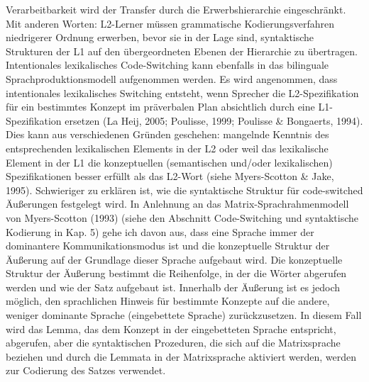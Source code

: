 \documentclass[
  letterpaper,
]{scrbook}
\begin{document}
Verarbeitbarkeit wird der Transfer durch die Erwerbshierarchie
eingeschränkt. Mit anderen Worten: L2-Lerner müssen grammatische
Kodierungsverfahren niedrigerer Ordnung erwerben, bevor sie in der Lage
sind, syntaktische Strukturen der L1 auf den übergeordneten Ebenen der
Hierarchie zu übertragen. Intentionales lexikalisches Code-Switching
kann ebenfalls in das bilinguale Sprachproduktionsmodell aufgenommen
werden. Es wird angenommen, dass intentionales lexikalisches Switching
entsteht, wenn Sprecher die L2-Spezifikation für ein bestimmtes Konzept
im präverbalen Plan absichtlich durch eine L1-Spezifikation ersetzen (La
Heij, 2005; Poulisse, 1999; Poulisse \& Bongaerts, 1994). Dies kann aus
verschiedenen Gründen geschehen: mangelnde Kenntnis des entsprechenden
lexikalischen Elements in der L2 oder weil das lexikalische Element in
der L1 die konzeptuellen (semantischen und/oder lexikalischen)
Spezifikationen besser erfüllt als das L2-Wort (siehe Myers-Scotton \&
Jake, 1995). Schwieriger zu erklären ist, wie die syntaktische Struktur
für code-switched Äußerungen festgelegt wird. In Anlehnung an das
Matrix-Sprachrahmenmodell von Myers-Scotton (1993) (siehe den Abschnitt
Code-Switching und syntaktische Kodierung in Kap. 5) gehe ich davon aus,
dass eine Sprache immer der dominantere Kommunikationsmodus ist und die
konzeptuelle Struktur der Äußerung auf der Grundlage dieser Sprache
aufgebaut wird. Die konzeptuelle Struktur der Äußerung bestimmt die
Reihenfolge, in der die Wörter abgerufen werden und wie der Satz
aufgebaut ist. Innerhalb der Äußerung ist es jedoch möglich, den
sprachlichen Hinweis für bestimmte Konzepte auf die andere, weniger
dominante Sprache (eingebettete Sprache) zurückzusetzen. In diesem Fall
wird das Lemma, das dem Konzept in der eingebetteten Sprache entspricht,
abgerufen, aber die syntaktischen Prozeduren, die sich auf die
Matrixsprache beziehen und durch die Lemmata in der Matrixsprache
aktiviert werden, werden zur Codierung des Satzes verwendet.
\end{document}
